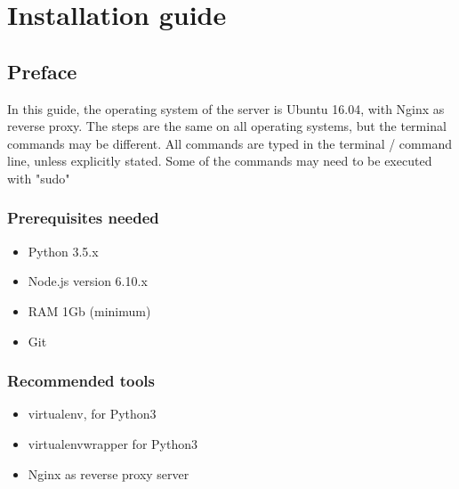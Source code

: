 


\chapter{Installation guide}

\section{Preface}
In this guide, the operating system of the server is Ubuntu 16.04, with Nginx as reverse proxy. The steps are the same on all operating systems, but the terminal commands may be different.
All commands are typed in the terminal / command line, unless explicitly stated. Some of the commands may need to be executed with "sudo"

\subsection{Prerequisites needed}
\begin{itemize}  
\item Python 3.5.x
\item Node.js version 6.10.x
\item RAM 1Gb (minimum)
\item Git
\end{itemize}

\subsection{Recommended tools}
\begin{itemize}  
    \item virtualenv, for Python3
    \item virtualenvwrapper for Python3
    \item Nginx as reverse proxy server
\end{itemize}

